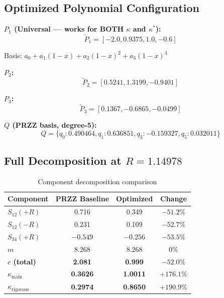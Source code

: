 \documentclass[11pt]{article}
\begin{document}
\subsection{Optimized Polynomial Configuration}

\textbf{$P_1$ (Universal --- works for BOTH $\kappa$ and $\kappa^*$):}
\begin{equation}
\boxed{\tilde{P}_1 = [-2.0, 0.9375, 1.0, -0.6]}
\end{equation}

Basis: $a_0 + a_1(1-x) + a_2(1-x)^2 + a_3(1-x)^3$

\textbf{$P_2$:}
\begin{equation}
\tilde{P}_2 = [0.5241, 1.3199, -0.9401]
\end{equation}

\textbf{$P_3$:}
\begin{equation}
\tilde{P}_3 = [0.1367, -0.6865, -0.0499]
\end{equation}

\textbf{$Q$ (PRZZ basis, degree-5):}
\begin{equation}
Q = \{q_0: 0.490464, q_1: 0.636851, q_3: -0.159327, q_5: 0.032011\}
\end{equation}

\subsection{Full Decomposition at $R = 1.14978$}

\begin{table}[h]
\centering
\caption{Component decomposition comparison}
\begin{tabular}{lccc}
\toprule
Component & PRZZ Baseline & Optimized & Change \\
\midrule
$S_{12}(+R)$ & 0.716 & 0.349 & $-51.2\%$ \\
$S_{12}(-R)$ & 0.231 & 0.109 & $-52.7\%$ \\
$S_{34}(+R)$ & $-0.549$ & $-0.256$ & $-53.5\%$ \\
$m$ & 8.268 & 8.268 & $0\%$ \\
\midrule
\textbf{$c$ (total)} & \textbf{2.081} & \textbf{0.999} & \textbf{$-52.0\%$} \\
\textbf{$\kappa_{\text{main}}$} & \textbf{0.3626} & \textbf{1.0011} & \textbf{$+176.1\%$} \\
\textbf{$\kappa_{\text{rigorous}}$} & \textbf{0.2974} & \textbf{0.8650} & \textbf{$+190.9\%$} \\
\bottomrule
\end{tabular}
\end{table}
\end{document}
